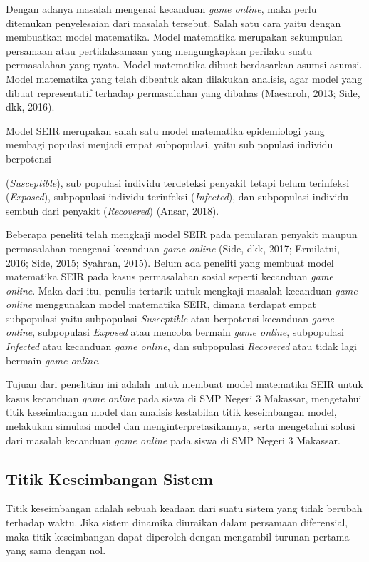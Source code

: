 \documentclass[a4paper, 12pt]{article}
\newcommand{\runninghead}[1]{%
  \fancyhead[L]{#1}
  \fancyhead[R]{\thepage}
}
\begin{document}
Dengan adanya masalah mengenai kecanduan \textit{game online}, maka perlu ditemukan penyelesaian dari masalah tersebut. Salah satu cara yaitu dengan membuatkan model matematika. Model matematika merupakan sekumpulan persamaan atau pertidaksamaan yang mengungkapkan perilaku suatu permasalahan yang nyata. Model matematika dibuat berdasarkan asumsi-asumsi. Model matematika yang telah dibentuk akan dilakukan analisis, agar model yang dibuat representatif terhadap permasalahan yang dibahas (Maesaroh, 2013; Side, dkk, 2016).

Model SEIR merupakan salah satu model matematika epidemiologi yang membagi populasi menjadi empat subpopulasi, yaitu sub populasi individu berpotensi

\clearpage
\runninghead{Side (2020)}
\setcounter{page}{93}

(\textit{Susceptible}), sub populasi individu terdeteksi penyakit tetapi belum terinfeksi (\textit{Exposed}), subpopulasi individu terinfeksi (\textit{Infected}), dan subpopulasi individu sembuh dari penyakit (\textit{Recovered}) (Ansar, 2018).

Beberapa peneliti telah mengkaji model SEIR pada penularan penyakit maupun permasalahan mengenai kecanduan \textit{game online} (Side, dkk, 2017; Ermilatni, 2016; Side, 2015; Syahran, 2015). Belum ada peneliti yang membuat model matematika SEIR pada kasus permasalahan sosial seperti kecanduan \textit{game online}. Maka dari itu, penulis tertarik untuk mengkaji masalah kecanduan \textit{game online} menggunakan model matematika SEIR, dimana terdapat empat subpopulasi yaitu subpopulasi \textit{Susceptible} atau berpotensi kecanduan \textit{game online}, subpopulasi \textit{Exposed} atau mencoba bermain \textit{game online}, subpopulasi \textit{Infected} atau kecanduan \textit{game online}, dan subpopulasi \textit{Recovered} atau tidak lagi bermain \textit{game online}.

Tujuan dari penelitian ini adalah untuk membuat model matematika SEIR untuk kasus kecanduan \textit{game online} pada siswa di SMP Negeri 3 Makassar, mengetahui titik keseimbangan model dan analisis kestabilan titik keseimbangan model, melakukan simulasi model dan menginterpretasikannya, serta mengetahui solusi dari masalah kecanduan \textit{game online} pada siswa di SMP Negeri 3 Makassar.

\subsection{Titik Keseimbangan Sistem}
Titik keseimbangan adalah sebuah keadaan dari suatu sistem yang tidak berubah terhadap waktu. Jika sistem dinamika diuraikan dalam persamaan diferensial, maka titik keseimbangan dapat diperoleh dengan mengambil turunan pertama yang sama dengan nol.
\end{document}
